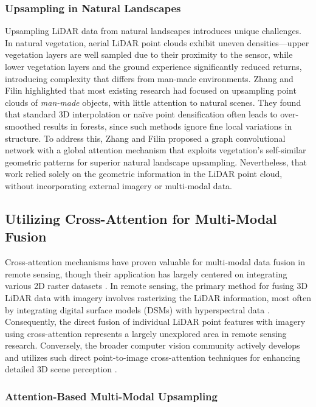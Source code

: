 \documentclass[preprints,article,accept,pdftex,moreauthors]{Definitions/mdpi}
\begin{document}
\subsubsection{Upsampling in Natural Landscapes}

Upsampling LiDAR data from natural landscapes introduces unique challenges. In natural vegetation, aerial LiDAR point clouds exhibit uneven densities—upper vegetation layers are well sampled due to their proximity to the sensor, while lower vegetation layers and the ground experience significantly reduced returns, introducing complexity that differs from man-made environments. Zhang and Filin \cite{zhang2022deep} highlighted that most existing research had focused on upsampling point clouds of \emph{man-made} objects, with little attention to natural scenes. They found that standard 3D interpolation or naïve point densification often leads to over-smoothed results in forests, since such methods ignore fine local variations in structure. To address this, Zhang and Filin proposed a graph convolutional network with a global attention mechanism that exploits vegetation's self-similar geometric patterns for superior natural landscape upsampling. Nevertheless, that work relied solely on the geometric information in the LiDAR point cloud, without incorporating external imagery or multi-modal data.

\subsection{Utilizing Cross-Attention for Multi-Modal Fusion}

Cross-attention mechanisms have proven valuable for multi-modal data fusion in remote sensing, though their application has largely centered on integrating various 2D raster datasets \cite{yan2025remote, ma2022crossmodal, qingyun2022cross, li2024cross}. In remote sensing, the primary method for fusing 3D LiDAR data with imagery involves rasterizing the LiDAR information, most often by integrating digital surface models (DSMs) with hyperspectral data \cite{yu2024dmsca, li2024multi, yang2024lidar}. Consequently, the direct fusion of individual LiDAR point features with imagery using cross-attention represents a largely unexplored area in remote sensing research. Conversely, the broader computer vision community actively develops and utilizes such direct point-to-image cross-attention techniques for enhancing detailed 3D scene perception \cite{zhu2024cams, yoo20203d, wu2021point}.


\subsubsection{Attention-Based Multi-Modal Upsampling}
\end{document}
